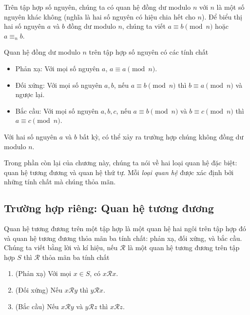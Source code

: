 \begin{example}\label{example:congruence}
    Trên tập hợp số nguyên, chúng ta có quan hệ đồng dư modulo $n$ với $n$ là một số nguyên khác không (nghĩa là hai số nguyên có hiệu chia hết cho $n$). Để biểu thị hai số nguyên $a$ và $b$ đồng dư modulo $n$, chúng ta viết $a\equiv b\pmod{n}$ hoặc $a\equiv_{n} b$.

    \noindent Quan hệ đồng dư modulo $n$ trên tập hợp số nguyên có các tính chất
    \begin{itemize}
        \item Phản xạ: Với mọi số nguyên $a$, $a\equiv a\pmod{n}$.
        \item Đối xứng: Với mọi số nguyên $a, b$, nếu $a\equiv b\pmod{n}$ thì $b\equiv a\pmod{n}$ và ngược lại.
        \item Bắc cầu: Với mọi số nguyên $a, b, c$, nếu $a\equiv b\pmod{n}$ và $b\equiv c\pmod{n}$ thì $a\equiv c\pmod{n}$.
    \end{itemize}

    Với hai số nguyên $a$ và $b$ bất kỳ, có thể xảy ra trường hợp chúng không đồng dư modulo $n$.
\end{example}

Trong phần còn lại của chương này, chúng ta nói về hai loại quan hệ đặc biệt: quan hệ tương đương và quan hệ thứ tự. Mỗi \textit{loại quan hệ} được xác định bởi những tính chất mà chúng thỏa mãn.

\subsection{Trường hợp riêng: Quan hệ tương đương}

\begin{definition}
    Quan hệ tương đương trên một tập hợp là một quan hệ hai ngôi trên tập hợp đó và quan hệ tương đương thỏa mãn ba tính chất: phản xạ, đối xứng, và bắc cầu. Chúng ta viết bằng lời và kí hiệu, nếu $\mathscr{R}$ là một quan hệ tương đương trên tập hợp $S$ thì $\mathscr{R}$ thỏa mãn ba tính chất
    \begin{enumerate}[label={(\roman*)}]
        \item (Phản xạ) Với mọi $x\in S$, có $x\mathscr{R}x$.
        \item (Đối xứng) Nếu $x\mathscr{R}y$ thì $y\mathscr{R}x$.
        \item (Bắc cầu) Nếu $x\mathscr{R}y$ và $y\mathscr{R}z$ thì $x\mathscr{R}z$.
    \end{enumerate}
\end{definition}

